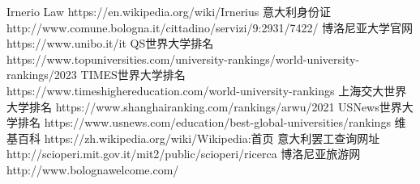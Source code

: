 \begin{thebibliography}{90}             %
\rhead[\fancyplain{}{\bfseries \leftmark}]{\fancyplain{}{\bfseries
\thepage}}
Irnerio Law https://en.wikipedia.org/wiki/Irnerius
意大利身份证 http://www.comune.bologna.it/cittadino/servizi/9:2931/7422/
博洛尼亚大学官网 https://www.unibo.it/it
QS世界大学排名 https://www.topuniversities.com/university-rankings/world-university-rankings/2023
TIMES世界大学排名 https://www.timeshighereducation.com/world-university-rankings
上海交大世界大学排名 https://www.shanghairanking.com/rankings/arwu/2021
USNews世界大学排名 https://www.usnews.com/education/best-global-universities/rankings
维基百科 https://zh.wikipedia.org/wiki/Wikipedia:首页
意大利罢工查询网址 http://scioperi.mit.gov.it/mit2/public/scioperi/ricerca
博洛尼亚旅游网 http://www.bolognawelcome.com/
\end{thebibliography}
